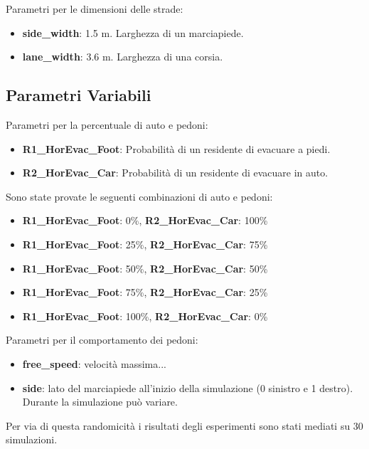 \noindent
Parametri per le dimensioni delle strade:
\begin{itemize}
  \item \textbf{side\_width}: 1.5 m. Larghezza di un marciapiede.
  \item \textbf{lane\_width}: 3.6 m. Larghezza di una corsia.
\end{itemize}

\subsection{Parametri Variabili}

Parametri per la percentuale di auto e pedoni:
\begin{itemize}
  \item \textbf{R1\_HorEvac\_Foot}: Probabilità di un residente di evacuare a piedi.
  \item \textbf{R2\_HorEvac\_Car}: Probabilità di un residente di evacuare in auto.
\end{itemize}

\noindent
Sono state provate le seguenti combinazioni di auto e pedoni:
\begin{itemize}
  \item \textbf{R1\_HorEvac\_Foot}: 0\%, \textbf{R2\_HorEvac\_Car}: 100\%
  \item \textbf{R1\_HorEvac\_Foot}: 25\%, \textbf{R2\_HorEvac\_Car}: 75\%
  \item \textbf{R1\_HorEvac\_Foot}: 50\%, \textbf{R2\_HorEvac\_Car}: 50\%
  \item \textbf{R1\_HorEvac\_Foot}: 75\%, \textbf{R2\_HorEvac\_Car}: 25\%
  \item \textbf{R1\_HorEvac\_Foot}: 100\%, \textbf{R2\_HorEvac\_Car}: 0\%
\end{itemize}

\noindent
Parametri per il comportamento dei pedoni:
\begin{itemize}
  \item \textbf{free\_speed}: velocità massima... %
  \item \textbf{side}: lato del marciapiede all'inizio della simulazione (0 sinistro e 1 destro). Durante la simulazione può variare. 
\end{itemize}

\noindent
Per via di questa randomicità i risultati degli esperimenti sono stati mediati su 30 simulazioni.
